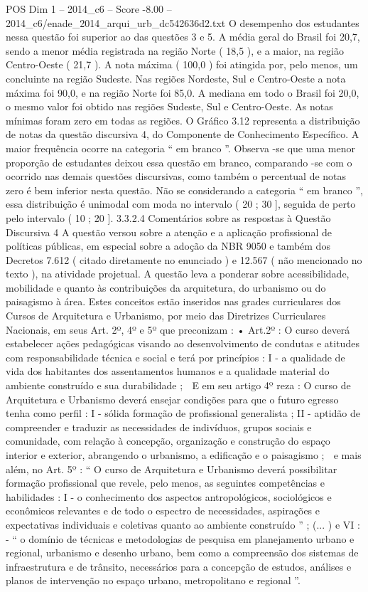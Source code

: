 \begin{textsample}{POS Dim 1 – 2014\_c6 – Score -8.00 – 2014\_c6/enade\_2014\_arqui\_urb\_dc542636d2.txt}
O desempenho dos estudantes nessa questão foi superior ao das questões 3 e 5.
A média geral do Brasil foi 20,7, sendo a menor média registrada na região Norte ( 18,5 ), e a maior, na região Centro-Oeste ( 21,7 ).
A nota máxima ( 100,0 ) foi atingida por, pelo menos, um concluinte na região Sudeste.
Nas regiões Nordeste, Sul e Centro-Oeste a nota máxima foi 90,0, e na região Norte foi 85,0.
A mediana em todo o Brasil foi 20,0, o mesmo valor foi obtido nas regiões Sudeste, Sul e Centro-Oeste.
As notas mínimas foram zero em todas as regiões.
O Gráfico 3.12 representa a distribuição de notas da questão discursiva 4, do Componente de Conhecimento Específico.
A maior frequência ocorre na categoria “ em branco ”.
Observa -se que uma menor proporção de estudantes deixou essa questão em branco, comparando -se com o ocorrido nas demais questões discursivas, como também o percentual de notas zero é bem inferior nesta questão.
Não se considerando a categoria “ em branco ”, essa distribuição é unimodal com moda no intervalo ( 20 ; 30 ], seguida de perto pelo intervalo ( 10 ; 20 ]. 3.3.2.4 Comentários sobre as respostas à Questão Discursiva 4 A questão versou sobre a atenção e a aplicação profissional de políticas públicas, em especial sobre a adoção da NBR 9050 e também dos Decretos 7.612 ( citado diretamente no enunciado ) e 12.567 ( não mencionado no texto ), na atividade projetual.
A questão leva a ponderar sobre acessibilidade, mobilidade e quanto às contribuições da arquitetura, do urbanismo ou do paisagismo à área.
Estes conceitos estão inseridos nas grades curriculares dos Cursos de Arquitetura e Urbanismo, por meio das Diretrizes Curriculares Nacionais, em seus Art. 2º, 4º e 5º que preconizam : • Art.2º : O curso deverá estabelecer ações pedagógicas visando ao desenvolvimento de condutas e atitudes com responsabilidade técnica e social e terá por princípios : I - a qualidade de vida dos habitantes dos assentamentos humanos e a qualidade material do ambiente construído e sua durabilidade ;  E em seu artigo 4º reza : O curso de Arquitetura e Urbanismo deverá ensejar condições para que o futuro egresso tenha como perfil : I - sólida formação de profissional generalista ; II - aptidão de compreender e traduzir as necessidades de indivíduos, grupos sociais e comunidade, com relação à concepção, organização e construção do espaço interior e exterior, abrangendo o urbanismo, a edificação e o paisagismo ;  e mais além, no Art. 5º : “ O curso de Arquitetura e Urbanismo deverá possibilitar formação profissional que revele, pelo menos, as seguintes competências e habilidades : I - o conhecimento dos aspectos antropológicos, sociológicos e econômicos relevantes e de todo o espectro de necessidades, aspirações e expectativas individuais e coletivas quanto ao ambiente construído ” ; (... ) e VI : - “ o domínio de técnicas e metodologias de pesquisa em planejamento urbano e regional, urbanismo e desenho urbano, bem como a compreensão dos sistemas de infraestrutura e de trânsito, necessários para a concepção de estudos, análises e planos de intervenção no espaço urbano, metropolitano e regional ”.

\end{textsample}
